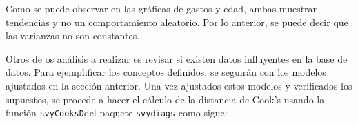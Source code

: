 \documentclass[
  spanish,
  12pt,
]{book}
\newenvironment{Shaded}{\begin{snugshade}}{\end{snugshade}}
\newcommand{\AttributeTok}[1]{\textcolor[rgb]{0.13,0.29,0.53}{#1}}
\newcommand{\DecValTok}[1]{\textcolor[rgb]{0.00,0.00,0.81}{#1}}
\newcommand{\FunctionTok}[1]{\textcolor[rgb]{0.13,0.29,0.53}{\textbf{#1}}}
\newcommand{\NormalTok}[1]{#1}
\newcommand{\OtherTok}[1]{\textcolor[rgb]{0.56,0.35,0.01}{#1}}
\newcommand{\SpecialCharTok}[1]{\textcolor[rgb]{0.81,0.36,0.00}{\textbf{#1}}}
\begin{document}
\begin{Shaded}
\end{Shaded}

Como se puede observar en las gráficas de gastos y edad, ambas muestran tendencias y no un comportamiento aleatorio. Por lo anterior, se puede decir que las varianzas no son constantes.

Otros de os análisis a realizar es revisar si existen datos influyentes en la base de datos. Para ejemplificar los conceptos definidos, se seguirán con los modelos ajustados en la sección anterior. Una vez ajustados estos modelos y verificados los supuestos, se procede a hacer el cálculo de la distancia de Cook's usando la función \texttt{svyCooksD}del paquete \texttt{svydiags} como sigue:

\begin{Shaded}
\end{Shaded}
\end{document}

